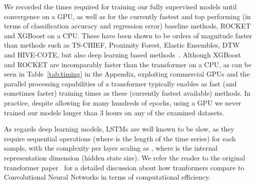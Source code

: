 \documentclass{article} \usepackage{iclr2021_conference,times}
\begin{document}
We recorded the times required for training our fully supervised models until convergence on a GPU, as well as for the currently fastest and top performing (in terms of classification accuracy and regression error) baseline methods, ROCKET and XGBoost on a CPU. These have been shown to be orders of magnitude faster than methods such as TS-CHIEF, Proximity Forest, Elastic Ensembles, DTW and HIVE-COTE, but also deep learning based methods~\cite{rocket_2020}.  Although XGBoost and ROCKET are incomparably faster than the transformer on a CPU, as can be seen in Table~\ref{tab:timing} in the Appendix, exploiting commercial GPUs and the parallel processing capabilities of a transformer typically enables as fast (and sometimes faster) training times as these (currently fastest available) methods. In practice, despite allowing for many hundreds of epochs, using a GPU we never trained our models longer than 3 hours on any of the examined datasets.

As regards deep learning models, LSTMs are well known to be slow, as they require  sequential operations (where  is the length of the time series) for each sample, with the complexity per layer scaling as , where  is the internal representation dimension (hidden state size). We refer the reader to the original transformer paper~\citep{vaswani_attention_2017} for a detailed discussion about how tranformers compare to Convolutional Neural Networks in terms of computational efficiency.
\end{document}
